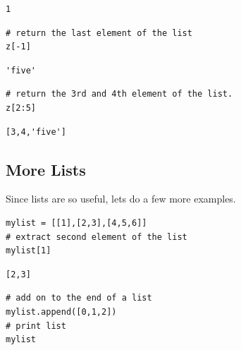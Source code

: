 \documentclass[%
oneside,                 %
final,                   %
10pt]{article}
\begin{document}
\begin{verbatim}
1
\end{verbatim}


\begin{verbatim}
# return the last element of the list
z[-1]
\end{verbatim}

\begin{verbatim}
'five'
\end{verbatim}


\begin{verbatim}
# return the 3rd and 4th element of the list.
z[2:5]
\end{verbatim}

\begin{verbatim}
[3,4,'five']
\end{verbatim}

\subsection{More Lists}

Since lists are so useful, lets do a few more examples.

\begin{verbatim}
mylist = [[1],[2,3],[4,5,6]]
# extract second element of the list
mylist[1]
\end{verbatim}

\begin{verbatim}
[2,3]
\end{verbatim}


\begin{verbatim}
# add on to the end of a list
mylist.append([0,1,2])
# print list
mylist
\end{verbatim}
\end{document}
